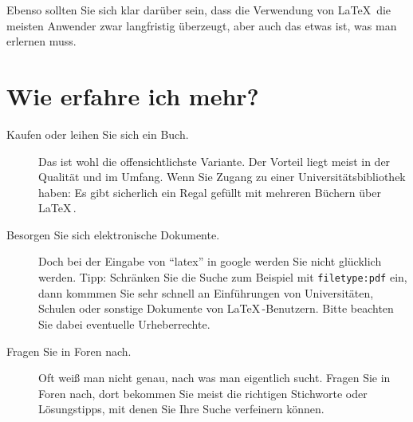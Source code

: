 \documentclass[a4paper,10pt]{scrartcl}
\begin{document}
Ebenso sollten Sie sich klar darüber sein, dass die Verwendung von \LaTeX \, die meisten Anwender zwar langfristig überzeugt, aber auch das etwas ist, was man erlernen muss.

\section*{Wie erfahre ich mehr?}
\begin{description}
 \item[Kaufen oder leihen Sie sich ein Buch.] Das ist wohl die offensichtlichste Variante. Der Vorteil liegt meist in der Qualität und im Umfang. Wenn Sie Zugang zu einer Universitätsbibliothek haben: Es gibt sicherlich ein Regal gefüllt mit mehreren Büchern über \LaTeX \,.
\item[Besorgen Sie sich elektronische Dokumente.] Doch bei der Eingabe von ``latex'' in google werden Sie nicht glücklich werden. Tipp: Schränken Sie die Suche zum Beispiel mit \texttt{filetype:pdf} ein, dann kommmen Sie sehr schnell an Einführungen von Universitäten, Schulen oder sonstige Dokumente von \LaTeX \,-Benutzern. Bitte beachten Sie dabei eventuelle Urheberrechte. 
\item[Fragen Sie in Foren nach.] Oft weiß man nicht genau, nach was man eigentlich sucht. Fragen Sie in Foren nach, dort bekommen Sie meist die richtigen Stichworte oder Lösungstipps, mit denen Sie Ihre Suche verfeinern können. 
\end{description}
\end{document}
